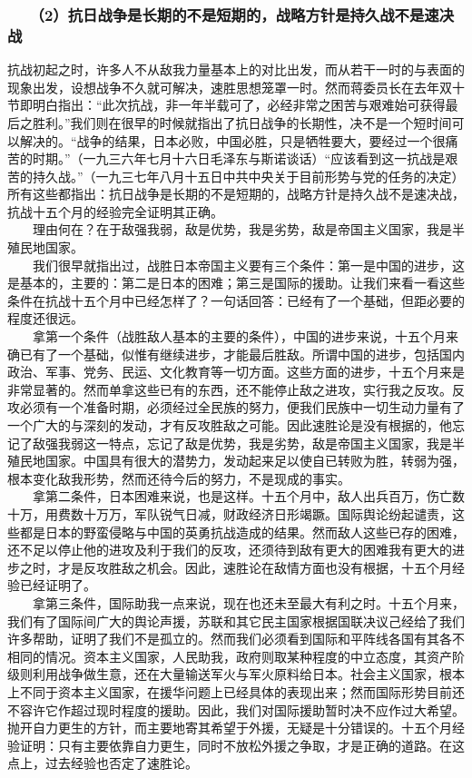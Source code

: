\documentclass[cn,11pt,chinese]{elegantbook}
\def\myformat#1{\hfil\hfil #1}
\begin{document}
\subsubsection*{\myformat{　　（2）抗日战争是长期的不是短期的，战略方针是持久战不是速决战}}
抗战初起之时，许多人不从敌我力量基本上的对比出发，而从若干一时的与表面的现象出发，设想战争不久就可解决，速胜思想笼罩一时。然而蒋委员长在去年双十节即明白指出：“此次抗战，非一年半载可了，必经非常之困苦与艰难始可获得最后之胜利。”我们则在很早的时候就指出了抗日战争的长期性，决不是一个短时间可以解决的。“战争的结果，日本必败，中国必胜，只是牺牲要大，要经过一个很痛苦的时期。”（一九三六年七月十六日毛泽东与斯诺谈话）“应该看到这一抗战是艰苦的持久战。”（一九三七年八月十五日中共中央关于目前形势与党的任务的决定）所有这些都指出：抗日战争是长期的不是短期的，战略方针是持久战不是速决战，抗战十五个月的经验完全证明其正确。\\
　　理由何在？在于敌强我弱，敌是优势，我是劣势，敌是帝国主义国家，我是半殖民地国家。\\
　　我们很早就指出过，战胜日本帝国主义要有三个条件：第一是中国的进步，这是基本的，主要的：第二是日本的困难；第三是国际的援助。让我们来看一看这些条件在抗战十五个月中已经怎样了？一句话回答：已经有了一个基础，但距必要的程度还很远。\\
　　拿第一个条件（战胜敌人基本的主要的条件），中国的进步来说，十五个月来确已有了一个基础，似惟有继续进步，才能最后胜敌。所谓中国的进步，包括国内政治、军事、党务、民运、文化教育等一切方面。这些方面的进步，十五个月来是非常显著的。然而单拿这些已有的东西，还不能停止敌之进攻，实行我之反攻。反攻必须有一个准备时期，必须经过全民族的努力，便我们民族中一切生动力量有了一个广大的与深刻的发动，才有反攻胜敌之可能。因此速胜论是没有根据的，他忘记了敌强我弱这一特点，忘记了敌是优势，我是劣势，敌是帝国主义国家，我是半殖民地国家。中国具有很大的潜势力，发动起来足以使自已转败为胜，转弱为强，根本变化敌我形势，然而还待今后的努力，不是现成的事实。\\
　　拿第二条件，日本困难来说，也是这样。十五个月中，敌人出兵百万，伤亡数十万，用费数十万万，军队锐气日减，财政经济日形竭蹶。国际舆论纷起谴责，这些都是日本的野蛮侵略与中国的英勇抗战造成的结果。然而敌人这些已存的困难，还不足以停止他的进攻及利于我们的反攻，还须待到敌有更大的困难我有更大的进步之时，才是反攻胜敌之机会。因此，速胜论在敌情方面也没有根据，十五个月经验已经证明了。\\
　　拿第三条件，国际助我一点来说，现在也还未至最大有利之时。十五个月来，我们有了国际间广大的舆论声援，苏联和其它民主国家根据国联决议己经给了我们许多帮助，证明了我们不是孤立的。然而我们必须看到国际和平阵线各国有其各不相同的情况。资本主义国家，人民助我，政府则取某种程度的中立态度，其资产阶级则利用战争做生意，还在大量输送军火与军火原料给日本。社会主义国家，根本上不同于资本主义国家，在援华问题上已经具体的表现出来；然而国际形势目前还不容许它作超过现时程度的援助。因此，我们对国际援助暂时决不应作过大希望。抛开自力更生的方针，而主要地寄其希望于外援，无疑是十分错误的。十五个月经验证明：只有主要依靠自力更生，同时不放松外援之争取，才是正确的道路。在这点上，过去经验也否定了速胜论。\\
\end{document}

